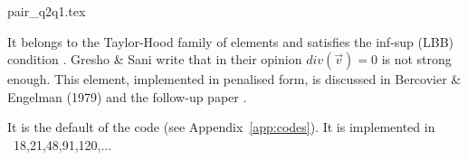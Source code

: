 \begin{flushright} {\tiny {\color{gray} pair\_q2q1.tex}} \end{flushright}

\noindent
\begin{minipage}{0.48\textwidth}
\begin{center}

\end{center}
\end{minipage}
\hfill
\begin{minipage}{0.48\textwidth}
\begin{center}

\end{center}
\end{minipage}

It belongs to the Taylor-Hood family of elements and satisfies the inf-sup (LBB) condition \cite[p215]{hugh}.
Gresho \& Sani \cite[p554]{grsa} write that in their opinion $div(\vec v)=0$ is not strong enough.
This element, implemented in penalised form, is discussed in Bercovier \& Engelman (1979) \cite{been79} 
and the follow-up paper \cite{been80}. 

It is the default of the \aspect code (see Appendix~\ref{app:codes}).
It is implemented in \stone~18,21,48,91,120,...
 


